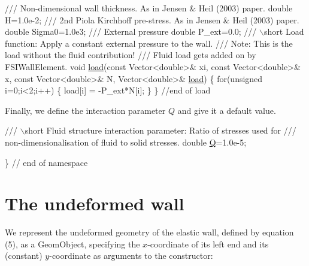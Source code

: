 \begin{DoxyCodeInclude}
\textcolor{comment}{}
\textcolor{comment}{ /// Non-dimensional wall thickness. As in Jensen & Heil (2003) paper.}
\textcolor{comment}{} \textcolor{keywordtype}{double} H=1.0e-2;
 \textcolor{comment}{}
\textcolor{comment}{ /// 2nd Piola Kirchhoff pre-stress. As in Jensen & Heil (2003) paper.}
\textcolor{comment}{} \textcolor{keywordtype}{double} Sigma0=1.0e3;
\textcolor{comment}{}
\textcolor{comment}{ /// External pressure}
\textcolor{comment}{} \textcolor{keywordtype}{double} P\_ext=0.0;
\textcolor{comment}{}
\textcolor{comment}{ /// \(\backslash\)short Load function: Apply a constant external pressure to the wall.}
\textcolor{comment}{ /// Note:  This is the load without the fluid contribution!}
\textcolor{comment}{ /// Fluid load gets added on by FSIWallElement.}
\textcolor{comment}{} \textcolor{keywordtype}{void} \hyperlink{namespaceGlobal__Physical__Variables_a321267e1efb30b5d586302509354fb07}{load}(\textcolor{keyword}{const} Vector<double>& xi, \textcolor{keyword}{const} Vector<double>& x,
           \textcolor{keyword}{const} Vector<double>& N, Vector<double>& \hyperlink{namespaceGlobal__Physical__Variables_a321267e1efb30b5d586302509354fb07}{load})
 \{ 
  \textcolor{keywordflow}{for}(\textcolor{keywordtype}{unsigned} i=0;i<2;i++) 
   \{
    load[i] = -P\_ext*N[i];
   \}
 \} \textcolor{comment}{//end of load}

\end{DoxyCodeInclude}


Finally, we define the interaction parameter $ Q $ and give it a default value.


\begin{DoxyCodeInclude}

\textcolor{comment}{}
\textcolor{comment}{ /// \(\backslash\)short Fluid structure interaction parameter: Ratio of stresses used for}
\textcolor{comment}{ /// non-dimensionalisation of fluid to solid stresses. }
\textcolor{comment}{} \textcolor{keywordtype}{double} \hyperlink{namespaceGlobal__Physical__Variables_a66cb7ecda9ba0cd72367dd697f154545}{Q}=1.0e-5;


\} \textcolor{comment}{// end of namespace}

\end{DoxyCodeInclude}




 

\hypertarget{index_undeformed}{}\section{The undeformed wall}\label{index_undeformed}
We represent the undeformed geometry of the elastic wall, defined by equation (5), as a {\ttfamily Geom\+Object}, specifying the $ x $-\/coordinate of its left end and its (constant) $ y $-\/coordinate as arguments to the constructor\+:

